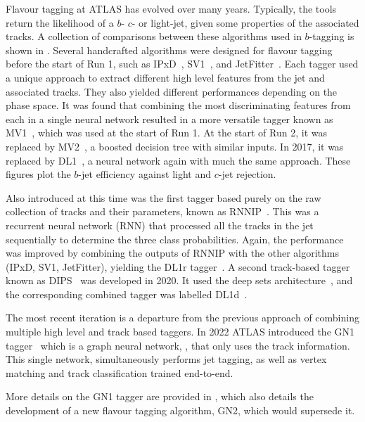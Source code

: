 Flavour tagging at ATLAS has evolved over many years.
Typically, the tools return the likelihood of a $b$- $c$- or light-jet, given some properties of the associated tracks.
A collection of comparisons between these algorithms used in $b$-tagging is shown in .
Several handcrafted algorithms were designed for flavour tagging before the start of Run 1, such as IPxD~\cite{IPxD}, SV1~\cite{SV1}, and JetFitter~\cite{JetFitter}.
Each tagger used a unique approach to extract different high level features from the jet and associated tracks.
They also yielded different performances depending on the phase space.
It was found that combining the most discriminating features from each in a single neural network resulted in a more versatile tagger known as MV1~\cite{MV1}, which was used at the start of Run 1.
At the start of Run 2, it was replaced by MV2~\cite{MV2}, a boosted decision tree with similar inputs.
In 2017, it was replaced by DL1~\cite{DL1}, a neural network again with much the same approach.
These figures plot the $b$-jet efficiency against light and $c$-jet rejection.

Also introduced at this time was the first tagger based purely on the raw collection of tracks and their parameters, known as RNNIP~\cite{RNNIP}.
This was a recurrent neural network (RNN) that processed all the tracks in the jet sequentially to determine the three class probabilities.
Again, the performance was improved by combining the outputs of RNNIP with the other algorithms (IPxD, SV1, JetFitter), yielding the DL1r tagger~\cite{Run2FTAlgs}.
A second track-based tagger known as \Gls{DIPS}~\cite{DIPS} was developed in 2020.
It used the deep sets architecture~\cite{DeepSets}, and the corresponding combined tagger was labelled \Gls{DL1d}~\cite{AlexThesis}.

The most recent iteration is a departure from the previous approach of combining multiple high level and track based taggers.
In 2022 ATLAS introduced the GN1 tagger~\cite{GN1} which is a graph neural network, , that only uses the track information.
This single network, simultaneously performs jet tagging, as well as vertex matching and track classification trained end-to-end.

More details on the GN1 tagger are provided in , which also details the development of a new flavour tagging algorithm, GN2, which would supersede it.

